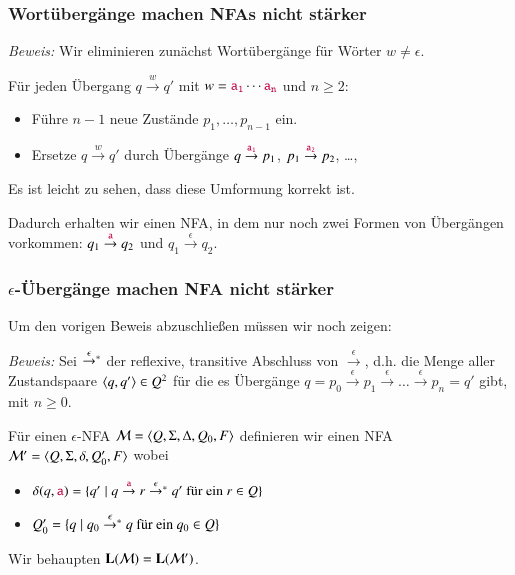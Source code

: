 \documentclass[onlymath]{beamer}
\begin{document}
\begin{frame}\frametitle{Wortübergänge machen NFAs nicht stärker}

\pause

\emph{Beweis:} Wir eliminieren zunächst Wortübergänge für Wörter $w\neq\epsilon$.\medskip
\pause

Für jeden Übergang $q\stackrel{w}{\to}q'$ mit $w=\mathtt{\textcolor{purple}{a_1}}\cdots \mathtt{\textcolor{purple}{a_n}}$ und $n\geq 2$:\\
\begin{itemize}
\item Führe $n-1$ neue Zustände $p_1,\ldots,p_{n-1}$ ein.
\item Ersetze $q\stackrel{w}{\to}q'$ durch Übergänge $q\stackrel{\mathtt{\textcolor{purple}{a_1}}}{\to}p_1$, $p_1\stackrel{\mathtt{\textcolor{purple}{a_2}}}{\to}p_2$, \ldots, 
\end{itemize}
Es ist leicht zu sehen, dass diese Umformung korrekt ist.
\bigskip

Dadurch erhalten wir einen NFA, in dem nur noch zwei Formen von Übergängen vorkommen:
$q_1\stackrel{\mathtt{\textcolor{purple}{a}}}{\to}q_2$ und $q_1\stackrel{\epsilon}{\to}q_2$.

\end{frame}

\begin{frame}\frametitle{$\epsilon$-Übergänge machen NFA nicht stärker}


Um den vorigen Beweis abzuschließen müssen wir noch zeigen:


\emph{Beweis:} Sei $\mathrel{\mathord{\stackrel{\epsilon}{\to}}{}^*}$ der reflexive, transitive Abschluss von $\stackrel{\epsilon}{\to}$, d.h. die Menge aller Zustandspaare $\langle{q,q'}\rangle\in Q^2$ für die es Übergänge $q=p_0\stackrel{\epsilon}{\to} p_1\stackrel{\epsilon}{\to}\ldots\stackrel{\epsilon}{\to}p_n=q'$ gibt, mit $n\geq 0$.
\medskip

Für einen $\epsilon$-NFA $\mathcal{M}=\langle{Q,\Sigma,\Delta,Q_0,F}\rangle$ definieren wir einen NFA
$\mathcal{M}'=\langle{Q,\Sigma,\delta,Q_0',F}\rangle$ wobei
\begin{itemize}
\item $\delta(q,\mathtt{\textcolor{purple}{a}})=\{ q'\mid q\stackrel{\mathtt{\textcolor{purple}{a}}}{\to}r\mathrel{\mathord{\stackrel{\epsilon}{\to}}{}^*} q'\text{ für ein }r\in Q\}$
\item $Q_0'=\{q\mid q_0\mathrel{\mathord{\stackrel{\epsilon}{\to}}{}^*} q\text{ für ein }q_0\in Q\}$
\end{itemize}
Wir behaupten $\textbf{\textcolor{black}{L}}(\mathcal{M})=\textbf{\textcolor{black}{L}}(\mathcal{M}')$.

\end{frame}
\end{document}
